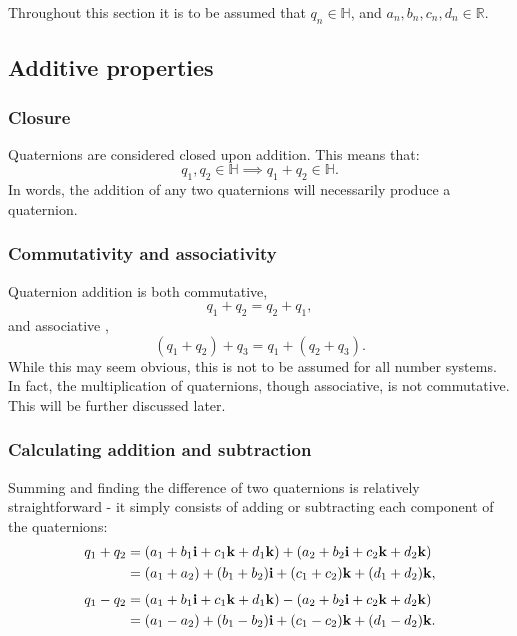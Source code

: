 \documentclass[10pt]{article}
\begin{document}
Throughout this section it is to be assumed that $q_n \in \mathbb{H}$, and $a_n, b_n, c_n, d_n \in \mathbb{R}$.

\subsection{Additive properties}

\subsubsection{Closure}

Quaternions are considered closed upon addition. This means that:
\begin{equation}
    q_1, q_2 \in \mathbb{H} \implies q_1 + q_2 \in \mathbb{H}.
\end{equation}
In words, the addition of any two quaternions will necessarily produce a quaternion. \cite{Illinois}

\subsubsection{Commutativity and associativity}

Quaternion addition is both commutative,
\begin{equation}
    q_1 + q_2 = q_2 + q_1,
\end{equation}
and associative \cite{Illinois},
\begin{equation}
    (q_1 + q_2) + q_3 = q_1 + (q_2 + q_3).
\end{equation}
While this may seem obvious, this is not to be assumed for all number systems. In fact, the multiplication of quaternions, though associative, is not commutative. This will be further discussed later.

\subsubsection{Calculating addition and subtraction}

Summing and finding the difference of two quaternions is relatively straightforward - it simply consists of adding or subtracting each component of the quaternions: \cite{Illinois}
\begin{equation}
    \begin{aligned}
        q_1 + q_2 & = (a_1 + b_1\vb{i} + c_1\vb{k} + d_1\vb{k}) + (a_2 + b_2\vb{i} + c_2\vb{k} + d_2\vb{k}) \\
                  & = (a_1+a_2) + (b_1+b_2)\vb{i} + (c_1+c_2)\vb{k} + (d_1+d_2)\vb{k},
    \end{aligned}
\end{equation}
\begin{equation}
    \begin{aligned}
        q_1 - q_2 & = (a_1 + b_1\vb{i} + c_1\vb{k} + d_1\vb{k}) - (a_2 + b_2\vb{i} + c_2\vb{k} + d_2\vb{k}) \\
                  & = (a_1-a_2) + (b_1-b_2)\vb{i} + (c_1-c_2)\vb{k} + (d_1-d_2)\vb{k}.
    \end{aligned}
\end{equation}
\end{document}
